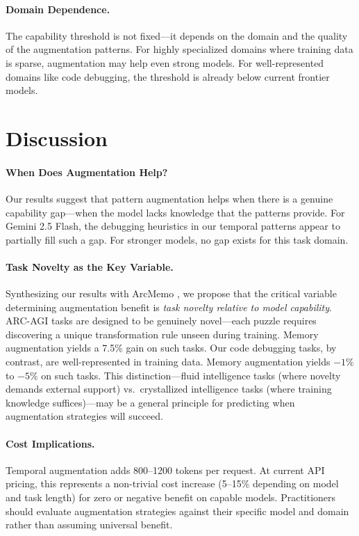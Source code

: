 \documentclass[11pt]{article}
\begin{document}
\paragraph{Domain Dependence.} The capability threshold is not fixed---it depends on the domain and the quality of the augmentation patterns. For highly specialized domains where training data is sparse, augmentation may help even strong models. For well-represented domains like code debugging, the threshold is already below current frontier models.

\section{Discussion}
\label{sec:discussion}

\paragraph{When Does Augmentation Help?} Our results suggest that pattern augmentation helps when there is a genuine capability gap---when the model lacks knowledge that the patterns provide. For Gemini 2.5 Flash, the debugging heuristics in our temporal patterns appear to partially fill such a gap. For stronger models, no gap exists for this task domain.

\paragraph{Task Novelty as the Key Variable.} Synthesizing our results with ArcMemo \citep{ho2025arcmemo}, we propose that the critical variable determining augmentation benefit is \emph{task novelty relative to model capability}. ARC-AGI tasks are designed to be genuinely novel---each puzzle requires discovering a unique transformation rule unseen during training. Memory augmentation yields a 7.5\% gain on such tasks. Our code debugging tasks, by contrast, are well-represented in training data. Memory augmentation yields $-1\%$ to $-5\%$ on such tasks. This distinction---fluid intelligence tasks (where novelty demands external support) vs.\ crystallized intelligence tasks (where training knowledge suffices)---may be a general principle for predicting when augmentation strategies will succeed.

\paragraph{Cost Implications.} Temporal augmentation adds 800--1200 tokens per request. At current API pricing, this represents a non-trivial cost increase (5--15\% depending on model and task length) for zero or negative benefit on capable models. Practitioners should evaluate augmentation strategies against their specific model and domain rather than assuming universal benefit.
\end{document}
